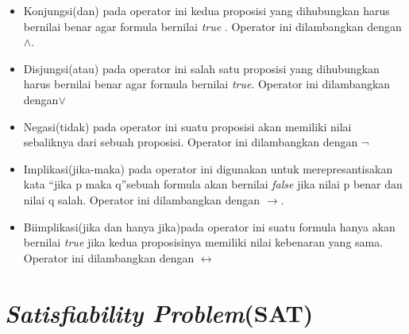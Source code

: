 \begin{itemize}
	\item Konjungsi(dan) pada operator ini kedua proposisi yang dihubungkan harus bernilai benar agar formula bernilai \textit{true}
	. Operator ini dilambangkan dengan $\wedge$.
	\item Disjungsi(atau) pada operator ini salah satu proposisi yang dihubungkan harus bernilai benar agar formula bernilai \textit{true}. Operator ini dilambangkan dengan$\lor$ 
	\item Negasi(tidak) pada operator ini suatu proposisi akan memiliki nilai sebaliknya dari sebuah proposisi. Operator ini dilambangkan dengan $\neg$
	\item Implikasi(jika-maka) pada operator ini digunakan untuk merepresantisakan kata \textquotedblleft jika p maka q\textquotedblright sebuah formula akan bernilai \textit{false} jika nilai p benar dan nilai q salah. Operator ini dilambangkan dengan $\to$. 
	\item Biimplikasi(jika dan hanya jika)pada operator ini suatu formula hanya akan bernilai \textit{true} jika kedua proposisinya memiliki nilai kebenaran yang sama. Operator ini dilambangkan dengan $\leftrightarrow$
	
\end{itemize}

\section{\textit{Satisfiability Problem}(SAT)}

